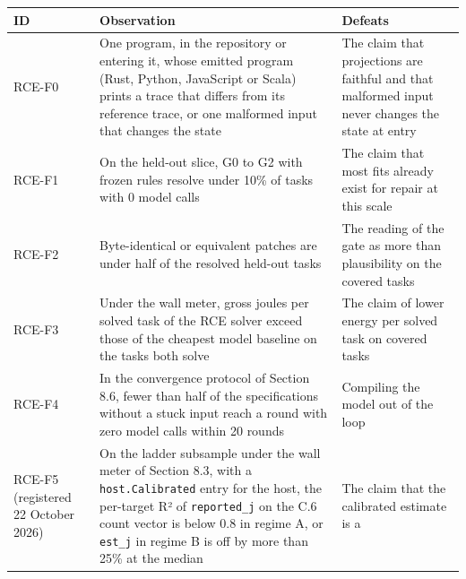 \documentclass[10pt,letterpaper]{article}
\newcounter{none}
\begin{document}
{\def\LTcaptype{none} %
{\footnotesize\setlength{\tabcolsep}{3.8pt}\renewcommand{\arraystretch}{1.15}
\begin{longtable}[]{@{}
  >{\raggedright\arraybackslash}p{}
  >{\raggedright\arraybackslash}p{}
  >{\raggedright\arraybackslash}p{}@{}}
\toprule\noalign{}
\begin{minipage}[b]{\linewidth}\raggedright
\textbf{ID}
\end{minipage} & \begin{minipage}[b]{\linewidth}\raggedright
\textbf{Observation}
\end{minipage} & \begin{minipage}[b]{\linewidth}\raggedright
\textbf{Defeats}
\end{minipage} \\
\midrule\noalign{}
\endhead
\bottomrule\noalign{}
\endlastfoot
RCE-F0 & One program, in the repository or entering it, whose emitted
program (Rust, Python, JavaScript or Scala) prints a trace that differs
from its reference trace, or one malformed input that changes the state
& The claim that projections are faithful and that malformed input never
changes the state at entry \\
RCE-F1 & On the held-out slice, G0 to G2 with frozen rules resolve under
10\% of tasks with 0 model calls & The claim that most fits already
exist for repair at this scale \\
RCE-F2 & Byte-identical or equivalent patches are under half of the
resolved held-out tasks & The reading of the gate as more than
plausibility on the covered tasks \\
RCE-F3 & Under the wall meter, gross joules per solved task of the RCE
solver exceed those of the cheapest model baseline on the tasks both
solve & The claim of lower energy per solved task on covered tasks \\
RCE-F4 & In the convergence protocol of Section 8.6, fewer than half of
the specifications without a stuck input reach a round with zero model
calls within 20 rounds & Compiling the model out of the loop \\
RCE-F5 (registered 22 October 2026) & On the ladder subsample under the
wall meter of Section 8.3, with a \texttt{host.Calibrated} entry for the
host, the per-target R² of \texttt{reported\_j} on the C.6 count vector
is below 0.8 in regime A, or \texttt{est\_j} in regime B is off by more
than 25\% at the median & The claim that the calibrated estimate is a

\end{longtable}}}
\end{document}
